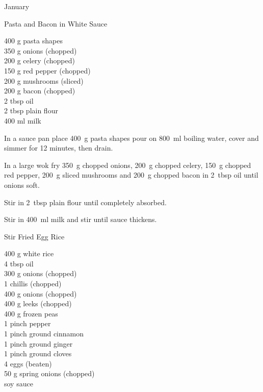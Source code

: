 \begin{menu}{January}
    \begin{recipe}{2}{Pasta and Bacon in White Sauce}%
		\begin{ingredients}
		400 g pasta shapes  \\
	350 g onions (chopped) \\
	200 g celery (chopped) \\
	150 g red pepper (chopped) \\
	200 g mushrooms (sliced) \\
	200 g bacon (chopped) \\
	2 tbsp oil  \\
	2 tbsp plain flour  \\
	400 ml milk  \\
	
		\end{ingredients}
	
	
    \begin{instructions}
    \item 
    In a
    sauce pan
    place
    400~g  pasta shapes
    pour on
    800~ml  boiling water,
    cover and simmer for 12 minutes, then drain.
  \item 
        In a large wok fry
        350~g chopped onions,
        200~g chopped celery,
        150~g chopped red pepper,
        200~g sliced mushrooms
        and
        200~g chopped bacon
        in
        2~tbsp  oil
        until onions soft.
      \item 
        Stir in
        2~tbsp  plain flour
        until completely absorbed.
      \item 
        Stir in
        400~ml  milk
        and stir
        until sauce thickens.
      
    \end{instructions}
    \end{recipe}%
  
    \begin{recipe}{2}{Stir Fried Egg Rice}%
		\begin{ingredients}
		400 g white rice  \\
	4 tbsp oil  \\
	300 g onions (chopped) \\
	1  chillis (chopped) \\
	400 g onions (chopped) \\
	400 g leeks (chopped) \\
	400 g frozen peas  \\
	1 pinch pepper  \\
	1 pinch ground cinnamon  \\
	1 pinch ground ginger  \\
	1 pinch ground cloves  \\
	4  eggs (beaten) \\
	50 g spring onions (chopped) \\
	  soy sauce  \\
	

\end{ingredients}
\end{recipe}
\end{menu}
